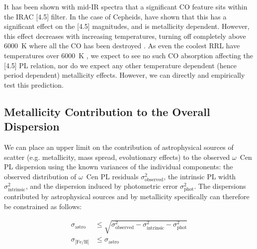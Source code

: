 \documentclass[a4paper,fleqn,usenatbib]{mnras}
\newcommand{\ocen}{$\omega$~Cen\xspace}
\begin{document}
It has been shown with mid-IR spectra that a significant CO feature sits within the IRAC [4.5] filter. In the case of Cepheids, \citet{2016MNRAS.459.1170S} have shown that this has a significant effect on the [4.5] magnitudes, and is metallicity dependent. However, this effect decreases with increasing temperatures, turning off completely above 6000~K where all the CO has been destroyed \citep{2016MNRAS.459.1170S}. As even the coolest RRL have temperatures over 6000~K \citep{1971PASP...83..697I}, we expect to see no such CO absorption affecting the [4.5] PL relation, nor do we expect any other temperature dependent (hence period dependent) metallicity effects. However, we can directly and empirically test this prediction. %

\subsection{Metallicity Contribution to the Overall Dispersion}
\label{sec:dispersions}

We can place an upper limit on the contribution of astrophysical sources of scatter (e.g. metallicity, mass spread, evolutionary effects) to the observed \ocen PL dispersion using the known variances of the individual components: the observed distribution of \ocen PL residuals $\sigma_{\text{observed}}^2$, the intrinsic PL width $\sigma_{\text{intrinsic}}^2$, and the dispersion induced by photometric error $\sigma_{\text{phot}}^2$. The dispersions contributed by astrophysical sources and by metallicity specifically can therefore be constrained as follows:

\begin{align}
\sigma_\text{astro} &\leq \sqrt{\sigma_{\text{observed}}^2 - \sigma_{\text{intrinsic}}^2 - \sigma_{\text{phot}}^2} \\
\sigma_{\text{[Fe/H]}} &\leq \sigma_\text{astro}
\end{align}


\end{document}
